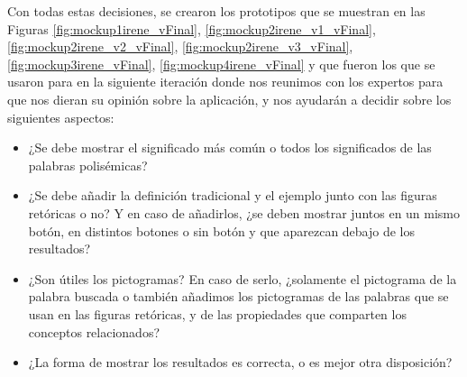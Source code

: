 Con todas estas decisiones, se crearon los prototipos que se muestran en las Figuras \ref{fig:mockup1irene_vFinal}, \ref{fig:mockup2irene_v1_vFinal}, \ref{fig:mockup2irene_v2_vFinal}, \ref{fig:mockup2irene_v3_vFinal}, \ref{fig:mockup3irene_vFinal}, \ref{fig:mockup4irene_vFinal} y que fueron los que se usaron para en la siguiente iteración donde nos reunimos con los expertos para que nos dieran su opinión sobre la aplicación, y nos ayudarán a decidir sobre los siguientes aspectos:
\begin{itemize}
	\item ¿Se debe mostrar el significado más común o todos los significados de las palabras polisémicas?
	\item ¿Se debe añadir la definición tradicional y el ejemplo junto con las figuras retóricas o no?  Y en caso de añadirlos, ¿se deben mostrar juntos en un mismo botón, en distintos botones o sin botón y que aparezcan debajo de los resultados?
	\item ¿Son útiles los pictogramas? En caso de serlo, ¿solamente el pictograma de la palabra buscada o también añadimos los pictogramas de las palabras que se usan en las figuras retóricas, y de las propiedades que comparten los conceptos relacionados?
	\item ¿La forma de mostrar los resultados es correcta, o es mejor otra disposición?
	
\end{itemize} 


 	
	
